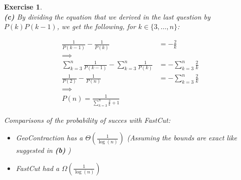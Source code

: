 \documentclass{article}
\newtheorem{exo}{Exercise}
\begin{document}
\begin{exo}{\ \\}
\noindent
\textbf{(c)} By dividing the equation that we derived in the last question by $P(k)P(k-1)$, we get the following, for $k \in \{3, \dots, n\}$:

\begin{align*}
    \frac{1}{P(k-1)} - \frac{1}{P(k)}  &= - \frac{2}{k}  \\
    \implies & \\
    \sum_{k=3}^{n} \frac{1}{P(k-1)} - \sum_{k=3}^{n} \frac{1}{P(k)}  &=
    - \sum_{k=3}^{n} \frac{2}{k}  \\
    \frac{1}{P(2)} - \frac{1}{P(n)}  &= -\sum_{k=3}^{n} \frac{2}{k}  \\
    \implies &\\
    P(n) = \frac{1}{\sum_{k=3}^{n} \frac{2}{k} + 1} 
\end{align*}

Comparisons of the probability of succes with FastCut:

\begin{itemize} 
    \item GeoContraction has a $\Theta(\frac{1}{\log(n)})$ (Assuming the bounds are exact like suggested in \textbf{(b)} )
    \item FastCut had a $\Omega(\frac{1}{\log(n)})$ 
\end{itemize}


\end{exo}
\end{document}
